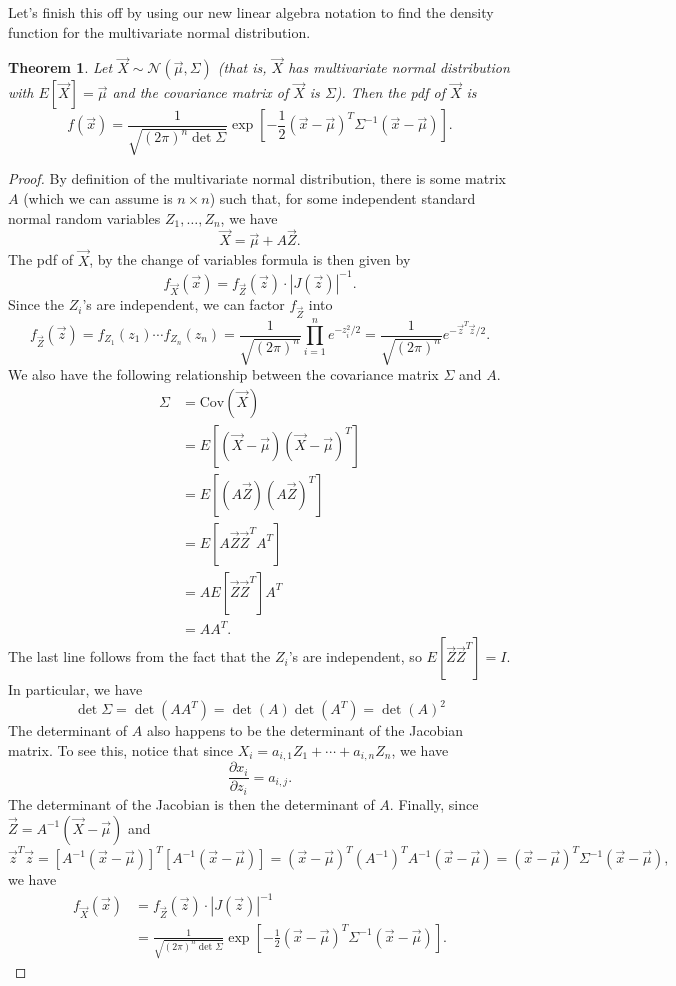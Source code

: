 \documentclass[12pt]{article}
\theoremstyle{plain}
\newtheorem{theorem}{Theorem}[section]
\theoremstyle{definition}
\theoremstyle{remark}
\newcommand{\Cov}{\ensuremath{\textrm{Cov}}}
\begin{document}
Let's finish this off by using our new linear algebra notation to find the density function for the multivariate normal distribution.
\begin{theorem}
    Let $\vec X \sim \mathcal{N}(\vec \mu, \Sigma)$ (that is, $\vec X$ has multivariate normal distribution with $E[\vec X] = \vec \mu$ and the covariance matrix of $\vec X$ is $\Sigma$).
    Then the pdf of $\vec X$ is
    \[
        f(\vec x) = \frac{1}{\sqrt{(2\pi)^n \det \Sigma}}\exp\left[ -\frac{1}{2}(\vec x - \vec \mu)^T\Sigma^{-1}(\vec x-\vec \mu)\right].
    \]
\end{theorem}
\begin{proof}
    By definition of the multivariate normal distribution, there is some matrix $A$ (which we can assume is $n\times n$) such that, for some independent standard normal random variables $Z_1, \ldots, Z_n$, we have
    \[
        \vec X = \vec \mu + A\vec Z.
    \]
    The pdf of $\vec X$, by the change of variables formula is then given by
    \[
        f_{\vec X}(\vec x) = f_{\vec Z}(\vec z)\cdot |J(\vec z)|^{-1}.
    \]
    Since the $Z_i$'s are independent, we can factor $f_{\vec Z}$ into
    \[
        f_{\vec Z}(\vec z) = f_{Z_1}(z_1)\cdots f_{Z_n}(z_n) = \frac{1}{\sqrt{(2\pi)^n}}\prod_{i=1}^ne^{-z_i^2/2} = \frac{1}{\sqrt{(2\pi)^n}}e^{-\vec z^T \vec z/2}.
    \]
    We also have the following relationship between the covariance matrix $\Sigma$ and $A$.
    \begin{align*}
        \Sigma &= \Cov(\vec X)\\
        &= E[(\vec X - \vec \mu)(\vec X - \vec \mu)^T]\\
        &= E[(A\vec Z)(A \vec Z)^T]\\
        &= E[A\vec Z \vec Z^T A^T]\\
        &= AE[\vec Z \vec Z^T]A^T\\
        &= AA^T.
    \end{align*}
    The last line follows from the fact that the $Z_i$'s are independent, so $E[\vec Z\vec Z^T] = I$.
    In particular, we have
    \[
        \det \Sigma = \det(AA^T) = \det(A)\det(A^T) = \det(A)^2
    \]
    The determinant of $A$ also happens to be the determinant of the Jacobian matrix.
    To see this, notice that since $X_i = a_{i,1}Z_1 + \cdots + a_{i,n}Z_n$, we have
    \[
        \frac{\partial x_i}{\partial z_i} = a_{i,j}.
    \]
    The determinant of the Jacobian is then the determinant of $A$.
    Finally, since $\vec Z = A^{-1}(\vec X - \vec \mu)$ and
    \[
        \vec z^T\vec z = [A^{-1}(\vec x - \vec \mu)]^T[A^{-1}(\vec x- \vec \mu)] = (\vec x - \vec\mu)^T(A^{-1})^TA^{-1}(\vec x - \vec \mu) = (\vec x - \vec \mu)^T\Sigma^{-1}(\vec x - \vec \mu),
    \]
    we have
    \begin{align*}
        f_{\vec X}(\vec x) &= f_{\vec Z}(\vec z)\cdot |J(\vec z)|^{-1}\\
        &= \frac{1}{\sqrt{(2\pi)^n \det \Sigma}}\exp\left[ -\frac{1}{2}(\vec x - \vec \mu)^T\Sigma^{-1}(\vec x-\vec \mu)\right].
    \end{align*}
\end{proof}
\end{document}
